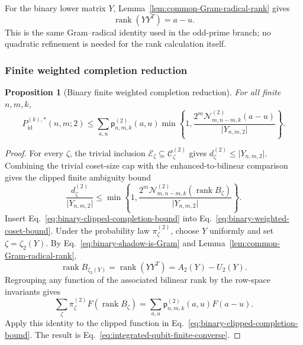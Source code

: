 \documentclass[11pt]{article}
\newcommand{\rank}{\operatorname{rank}}
\newcommand{\1}{\mathbf 1}
\theoremstyle{plain}
\newtheorem{proposition}[theorem]{Proposition}
\theoremstyle{definition}
\theoremstyle{remark}
\begin{document}
For the binary lower matrix $Y$, Lemma~\ref{lem:common-Gram-radical-rank}
gives
\begin{equation}
 \rank(YY^T)=a-u.
 \label{eq:binary-shadow-rank-au}
\end{equation}
This is the same Gram--radical identity used in the odd-prime branch; no
quadratic refinement is needed for the rank calculation itself.


\subsubsection{Finite weighted completion reduction}
\label{subsubsec:binary-finite-weighted-reduction}

\begin{proposition}[Binary finite weighted completion reduction]
\label{prop:binary-finite-weighted-completion-reduction}
For all finite $n,m,k$,
\begin{equation}
 P_{\mathrm{id}}^{(k),*}(n,m;2)
 \le\sum_{a,u}\mathsf p_{n,m,k}^{(2)}(a,u)
 \min\left\{1,
 \frac{2^m\mathcal N_{m,n-m,k}^{(2)}(a-u)}{\lvert Y_{n,m,2}\rvert}
 \right\}.
 \label{eq:integrated-qubit-finite-converse}
\end{equation}
\end{proposition}
\begin{proof}
For every $\zeta$, the trivial inclusion
$\mathcal E_\zeta\subseteq\mathcal C_\zeta^{(2)}$ gives
$d_\zeta^{(2)}\le\lvert Y_{n,m,2}\rvert$.  Combining the trivial coset-size cap with the enhanced-to-bilinear comparison
gives the clipped finite ambiguity bound
\begin{equation}
 \frac{d_\zeta^{(2)}}{\lvert Y_{n,m,2}\rvert}
 \le\min\left\{1,
 \frac{2^m\mathcal N_{m,n-m,k}^{(2)}(\rank B_\zeta)}
 {\lvert Y_{n,m,2}\rvert}\right\}.
 \label{eq:binary-clipped-completion-bound}
\end{equation}
Insert Eq.~\eqref{eq:binary-clipped-completion-bound} into
Eq.~\eqref{eq:binary-weighted-coset-bound}.  Under the probability law
$\pi_\zeta^{(2)}$, choose $Y$ uniformly and set $\zeta=\zeta_2(Y)$.
By Eq.~\eqref{eq:binary-shadow-is-Gram} and
Lemma~\ref{lem:common-Gram-radical-rank},
\begin{equation}
 \rank B_{\zeta_2(Y)}
 =\rank(YY^T)=A_2(Y)-U_2(Y).
 \label{eq:binary-zeta-rank-regrouping}
\end{equation}
Regrouping any function of the associated bilinear rank by the row-space
invariants gives
\begin{equation}
 \sum_\zeta\pi_\zeta^{(2)}F(\rank B_\zeta)
 =\sum_{a,u}\mathsf p_{n,m,k}^{(2)}(a,u)F(a-u).
 \label{eq:binary-zeta-to-au-regrouping}
\end{equation}
Apply this identity to the clipped function in
Eq.~\eqref{eq:binary-clipped-completion-bound}.  The result is
Eq.~\eqref{eq:integrated-qubit-finite-converse}.
\end{proof}
\end{document}
